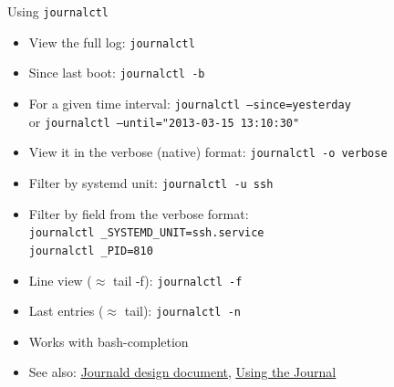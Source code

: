 \documentclass[11pt,final,usepdftitle=false]{beamer}
\begin{document}
\begin{frame}{Using \texttt{journalctl}}
	\begin{itemize}
		\item View the full log: \texttt{journalctl}
			\hbr
		\item Since last boot: \texttt{journalctl -b}
			\hbr
	\item For a given time interval: \texttt{journalctl --since=yesterday}\\
		or \texttt{journalctl --until="2013-03-15 13:10:30"}
			\hbr
		\item View it in the verbose (native) format: \texttt{journalctl -o verbose}
			\hbr
		\item Filter by systemd unit: \texttt{journalctl -u ssh}
			\hbr
		\item Filter by field from the verbose format:\\
			\texttt{journalctl \_SYSTEMD\_UNIT=ssh.service}\\
			\texttt{journalctl \_PID=810}
			\hbr
		\item Line view ($\approx$ tail -f): \texttt{journalctl -f}
			\hbr
		\item Last entries ($\approx$ tail): \texttt{journalctl -n}
		\hbr
		\item Works with bash-completion
			\hbr
		\item See also: \href{https://docs.google.com/document/pub?id=1IC9yOXj7j6cdLLxWEBAGRL6wl97tFxgjLUEHIX3MSTs}{\ul{Journald design document}}, \href{http://0pointer.net/blog/projects/journalctl.html}{\ul{Using the Journal}}

	\end{itemize}
\end{frame}
\end{document}
